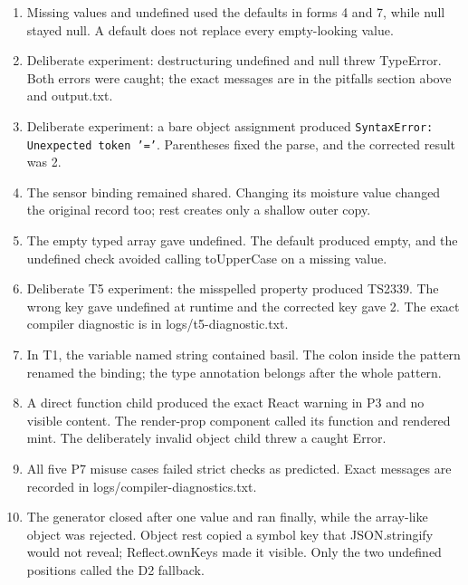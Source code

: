 \documentclass[
  10pt,
  a4paper,
]{article}
\begin{document}
\begin{enumerate}
\def\labelenumi{\arabic{enumi}.}
\item
  Missing values and undefined used the defaults in forms 4 and 7, while
  null stayed null. A default does not replace every empty-looking
  value.
\item
  Deliberate experiment: destructuring undefined and null threw
  TypeError. Both errors were caught; the exact messages are in the
  pitfalls section above and output.txt.
\item
  Deliberate experiment: a bare object assignment produced
  \texttt{SyntaxError:\allowbreak{} Unexpected token '=\allowbreak{}'}.
  Parentheses fixed the parse, and the corrected result was 2.
\item
  The sensor binding remained shared. Changing its moisture value
  changed the original record too; rest creates only a shallow outer
  copy.
\item
  The empty typed array gave undefined. The default produced empty, and
  the undefined check avoided calling toUpperCase on a missing value.
\item
  Deliberate T5 experiment: the misspelled property produced TS2339. The
  wrong key gave undefined at runtime and the corrected key gave 2. The
  exact compiler diagnostic is in logs/t5-diagnostic.txt.
\item
  In T1, the variable named string contained basil. The colon inside the
  pattern renamed the binding; the type annotation belongs after the
  whole pattern.
\item
  A direct function child produced the exact React warning in P3 and no
  visible content. The render-prop component called its function and
  rendered mint. The deliberately invalid object child threw a caught
  Error.
\item
  All five P7 misuse cases failed strict checks as predicted. Exact
  messages are recorded in logs/compiler-diagnostics.txt.
\item
  The generator closed after one value and ran finally, while the
  array-like object was rejected. Object rest copied a symbol key that
  JSON.stringify would not reveal; Reflect.ownKeys made it visible. Only
  the two undefined positions called the D2 fallback.
\end{enumerate}
\end{document}
